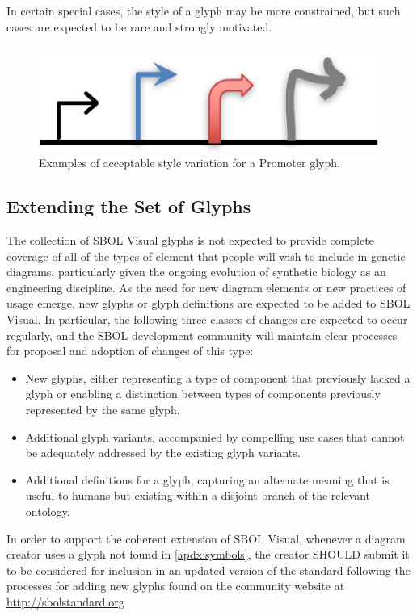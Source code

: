 In certain special cases, the style of a glyph may be more constrained, but such cases are expected to be rare and strongly motivated.

\begin{figure}[h!]
\centering
\includegraphics[scale=1.0]{figures/style-variation.pdf}
\caption{Examples of acceptable style variation for a Promoter glyph.}
\label{f:stylevariation}
\end{figure}


\subsection{Extending the Set of Glyphs}\label{sec:extension}
The collection of SBOL Visual glyphs is not expected to provide
complete coverage of all of the types of element that people will
wish to include in genetic diagrams, particularly given the ongoing
evolution of synthetic biology as an engineering discipline.
%
As the need for new diagram elements or new practices of usage emerge,
new glyphs or glyph definitions are expected to be added to SBOL
Visual.
%
In particular, the following three classes of changes are expected to occur regularly,
and the SBOL development community will maintain clear processes for
proposal and adoption of changes of this type:
\begin{itemize}
\item New glyphs, either representing a type of component that
  previously lacked a glyph or enabling a distinction between types of
  components previously represented by the same glyph.
\item Additional glyph variants, accompanied by compelling use cases
  that cannot be adequately addressed by the existing glyph variants.
\item Additional definitions for a glyph, capturing an alternate
  meaning that is useful to humans but existing within a disjoint
  branch of the relevant ontology.
\end{itemize}

In order to support the coherent extension of SBOL Visual, 
whenever a diagram creator uses a glyph not found in \ref{apdx:symbols}, 
the creator SHOULD submit it to be considered for inclusion in an updated version of the standard following the processes for adding new glyphs found on the community website at \url{http://sbolstandard.org}



